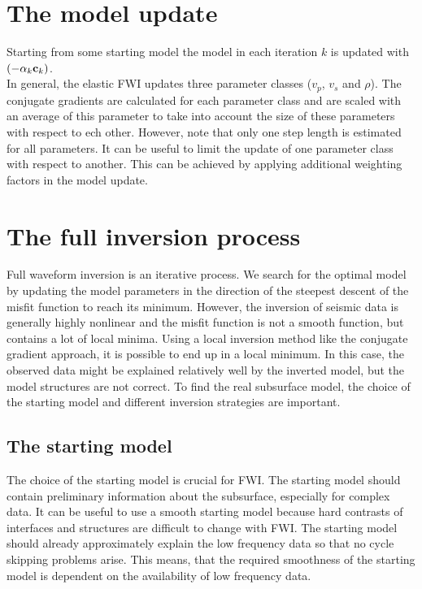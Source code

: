 \section{The model update} 
Starting from some starting model the model in each iteration $k$ is updated with $(-\alpha_k\textbf c_k)$.\\
In general, the elastic FWI updates three parameter classes ($v_p$, $v_s$ and $\rho$). The conjugate gradients are calculated for each parameter class and are scaled with an average of this parameter to take into account the size of these parameters with respect to ech other. However, note that only one step length is estimated for all parameters. It can be useful to limit the update of one parameter class with respect to another. This can be achieved by applying additional weighting factors in the model update. 
\section{The full inversion process}
Full waveform inversion is an iterative process. We search for the optimal model by updating the model parameters in the direction of the steepest descent of the misfit function to reach its minimum. However, the inversion of seismic data is generally highly nonlinear and the misfit function is not a smooth function, but contains a lot of local minima. Using a local inversion method like the conjugate gradient approach, it is possible to end up in a local minimum. In this case, the observed data might be explained relatively well by the inverted model, but the model structures are not correct. To find the real subsurface model, the choice of the starting model and different inversion strategies are important.
\subsection{The starting model}
The choice of the starting model is crucial for FWI. The starting model should contain preliminary information about the subsurface, especially for complex data. It can be useful to use a smooth starting model because hard contrasts of interfaces and structures are difficult to change with FWI. The starting model should already approximately explain the low frequency data so that no cycle skipping problems arise. This means, that the required smoothness of the starting model is dependent on the availability of low frequency data.
